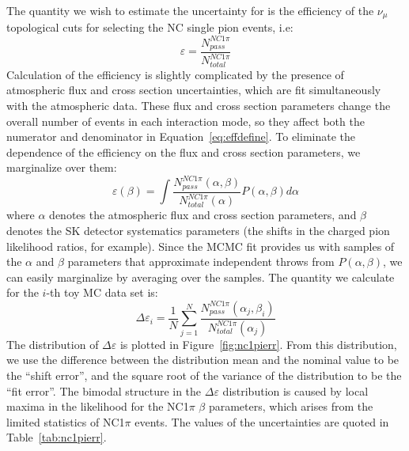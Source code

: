 \documentclass[12pt]{article}
\def\numu{$\nu_{\mu}$\xspace}
\begin{document}
The quantity we wish to estimate the uncertainty for is the efficiency of the \numu topological cuts for
selecting the NC single pion events, i.e\@:
\begin{equation}
  \varepsilon =\frac{N_{pass}^{NC1\pi}}{N_{total}^{NC1\pi}}
  \label{eq:effdefine}
\end{equation}
Calculation of the efficiency is slightly complicated by the presence
of atmospheric flux and cross section uncertainties, which are fit simultaneously with the atmospheric
data.  These flux and cross section parameters change the overall number of events in each interaction mode, so they affect
both the numerator and denominator in Equation~\ref{eq:effdefine}.  To eliminate the dependence of the efficiency
on the flux and cross section parameters, we marginalize over them:
\begin{equation}
  \varepsilon(\beta) = \int \frac{N_{pass}^{NC1\pi}(\alpha,\beta)}{N_{total}^{NC1\pi}(\alpha)}P(\alpha,\beta)d\alpha
  \label{eq:margeff}
\end{equation}
where $\alpha$ denotes the atmospheric flux and cross section parameters, and $\beta$ denotes the SK detector
systematics parameters (the shifts in the charged pion likelihood ratios, for example).  Since the MCMC fit provides 
us with samples of the $\alpha$ and $\beta$ parameters that approximate independent throws from $P(\alpha, \beta)$,
we can easily marginalize by averaging over the samples.  The quantity we calculate for the $i$-th toy MC
data set is:
\begin{equation}
  \Delta \varepsilon_{i} = \frac{1}{N} \sum\limits_{j=1}^{N}
  \frac{N_{pass}^{NC1\pi}(\alpha_{j},\beta_{i})}{N_{total}^{NC1\pi}(\alpha_{j})}
\end{equation}
The distribution of $\Delta \varepsilon$ is plotted in
Figure~\ref{fig:nc1pierr}.  From this distribution, we use the difference
between the distribution mean and the nominal value to be the ``shift error'',
and the square root of the variance of the distribution to be the ``fit
error''.  The bimodal structure in the $\Delta \varepsilon$ distribution is
caused by local maxima in the likelihood for the NC1$\pi$ $\beta$ parameters,
which arises from the limited statistics of NC1$\pi$ events.  The values of the
uncertainties are quoted in Table~\ref{tab:nc1pierr}.
\end{document}
